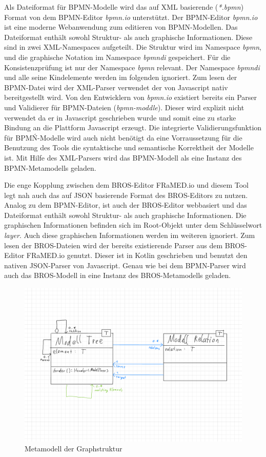 Als Dateiformat für BPMN-Modelle wird das auf XML basierende (\emph{*.bpmn}) Format von dem BPMN-Editor \emph{bpmn.io} unterstützt.
Der BPMN-Editor \emph{bpmn.io} ist eine moderne Webanwendung zum editieren von BPMN-Modellen.
Das Dateiformat enthält sowohl Struktur- als auch graphische Informationen.
Diese sind in zwei XML-Namespaces aufgeteilt.
Die Struktur wird im Namespace \emph{bpmn}, und die graphische Notation im Namespace \emph{bpmndi} gespeichert.
Für die Konsistenzprüfung ist nur der Namespace \emph{bpmn} relevant.
Der Namespace \emph{bpmndi} und alle seine Kindelemente werden im folgenden ignoriert.
Zum lesen der BPMN-Datei wird der XML-Parser verwendet der von Javascript nativ bereitgestellt wird.
Von den Entwicklern von \emph{bpmn.io} existiert bereits ein Parser und Validierer für BPMN-Dateien (\emph{bpmn-moddle}).
Dieser wird explizit nicht verwendet da er in Javascript geschrieben wurde und somit eine zu starke Bindung an die Plattform Javascript erzeugt.
Die integrierte Validierungsfunktion für BPMŃ-Modelle wird auch nicht benötigt da eine Vorraussetzung für die Benutzung des Tools die syntaktische und semantische Korrektheit der Modelle ist. 
Mit Hilfe des XML-Parsers wird das BPMN-Modell als eine Instanz des BPMN-Metamodells geladen.

Die enge Kopplung zwischen dem BROS-Editor FRaMED.io und diesem Tool legt nah auch das auf JSON basierende Format des BROS-Editors zu nutzen.
Analog zu dem BPMN-Editor, ist auch der BROS-Editor webbasiert und das Dateiformat enthält sowohl Struktur- als auch graphische Informationen.
Die graphischen Informationen befinden sich im Root-Objekt unter dem Schlüsselwort \emph{layer}.
Auch diese graphischen Informationen werden im weiteren ignoriert.
Zum lesen der BROS-Dateien wird der bereits existierende Parser aus dem BROS-Editor FRaMED.io genutzt.
Dieser ist in Kotlin geschrieben und benutzt den nativen JSON-Parser von Javascript.
Genau wie bei dem BPMN-Parser wird auch das BROS-Modell in eine Instanz des BROS-Metamodells geladen.

\begin{figure}
    \centering
    \includegraphics[width=\textwidth,keepaspectratio]{../images/UmlGraph.pdf}%
    \caption{Metamodell der Graphstruktur}%
    \label{fig:UmlGraph}
\end{figure}

